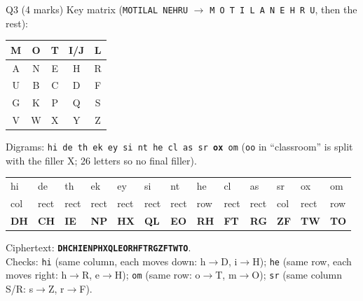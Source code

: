 \documentclass[11pt,a4paper]{article}
\newcommand{\ttx}[1]{\texttt{#1}}
\begin{document}
{\begin{sol}{Q3 (4 marks)}
Key matrix (\ttx{MOTILAL NEHRU} $\to$ \ttx{M O T I L A N E H R U}, then the rest):
\begin{center}\small
\begin{tabular}{|c|c|c|c|c|}\hline
M&O&T&I/J&L\\\hline A&N&E&H&R\\\hline U&B&C&D&F\\\hline G&K&P&Q&S\\\hline V&W&X&Y&Z\\\hline
\end{tabular}
\end{center}
Digrams: \ttx{hi de th ek ey si nt he cl as sr \textbf{ox} om} (\ttx{oo} in ``classroom'' is split with the filler X; 26 letters so no final filler).
\begin{center}\small
\begin{tabular}{@{}lllllllllllll@{}}
\toprule
hi&de&th&ek&ey&si&nt&he&cl&as&sr&ox&om\\
col&rect&rect&rect&rect&rect&rect&row&rect&rect&col&rect&row\\
\textbf{DH}&\textbf{CH}&\textbf{IE}&\textbf{NP}&\textbf{HX}&\textbf{QL}&\textbf{EO}&\textbf{RH}&\textbf{FT}&\textbf{RG}&\textbf{ZF}&\textbf{TW}&\textbf{TO}\\
\bottomrule
\end{tabular}
\end{center}
Ciphertext: \textbf{\ttx{DHCHIENPHXQLEORHFTRGZFTWTO}}.\\
Checks: \ttx{hi} (same column, each moves down: h$\to$D, i$\to$H); \ttx{he} (same row, each moves right: h$\to$R, e$\to$H); \ttx{om} (same row: o$\to$T, m$\to$O); \ttx{sr} (same column S/R: s$\to$Z, r$\to$F).
\end{sol}

}
\end{document}
